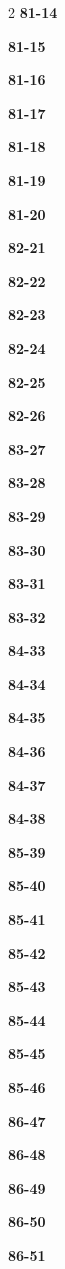 \documentclass[10pt,a4paper]{article}
\begin{document}
\begin{multicols}{2}
\noindent\textbf{81-14}\ \par
\noindent\textbf{81-15}\ \par
\noindent\textbf{81-16}\ \par
\noindent\textbf{81-17}\ \par
\noindent\textbf{81-18}\ \par
\noindent\textbf{81-19}\ \par
\noindent\textbf{81-20}\ \par
\noindent\textbf{82-21}\ \par
\noindent\textbf{82-22}\ \par
\noindent\textbf{82-23}\ \par
\noindent\textbf{82-24}\ \par
\noindent\textbf{82-25}\ \par
\noindent\textbf{82-26}\ \par
\noindent\textbf{83-27}\ \par
\noindent\textbf{83-28}\ \par
\noindent\textbf{83-29}\ \par
\noindent\textbf{83-30}\ \par
\noindent\textbf{83-31}\ \par
\noindent\textbf{83-32}\ \par
\noindent\textbf{84-33}\ \par
\noindent\textbf{84-34}\ \par
\noindent\textbf{84-35}\ \par
\noindent\textbf{84-36}\ \par
\noindent\textbf{84-37}\ \par
\noindent\textbf{84-38}\ \par
\noindent\textbf{85-39}\ \par
\noindent\textbf{85-40}\ \par
\noindent\textbf{85-41}\ \par
\noindent\textbf{85-42}\ \par
\noindent\textbf{85-43}\ \par
\noindent\textbf{85-44}\ \par
\noindent\textbf{85-45}\ \par
\noindent\textbf{85-46}\ \par
\noindent\textbf{86-47}\ \par
\noindent\textbf{86-48}\ \par
\noindent\textbf{86-49}\ \par
\noindent\textbf{86-50}\ \par
\noindent\textbf{86-51}\ \par

\end{multicols}
\end{document}
